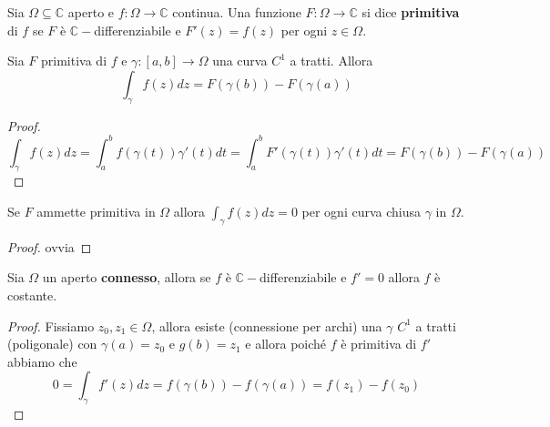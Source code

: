 \begin{definition}[Primitiva]
    Sia \(\Omega \subseteq \mathbb{C}\) aperto e \(f : \Omega \to \mathbb{C}\)
    continua. Una funzione \(F : \Omega \to \mathbb{C}\) si dice \textbf{primitiva} di
    \(f\) se \(F\) è \(\mathbb{C}-\)differenziabile e \(F'(z) = f(z)\) per ogni
    \(z \in \Omega\).
\end{definition}
\begin{proposition}
    Sia \(F\) primitiva di \(f\) e \(\gamma:[a,b] \to \Omega\) una curva
    \(C^{1}\) a tratti. Allora 
    \[
        \int_{\gamma} f(z) dz = F{(\gamma{(b)})} - F{(\gamma{(a)})}
    \]
\end{proposition}
\begin{proof}
    \[
        \int_{\gamma} f(z) dz = \int_{a}^{b} f{(\gamma{(t)})}\gamma'(t) dt =
        \int_{a}^{b} F'{(\gamma{(t)})}\gamma'(t) dt = F{(\gamma{(b)})} -
        F{(\gamma{(a)})}
    \]
\end{proof}
\begin{corollary}
    Se \(F\) ammette primitiva in \(\Omega\) allora \(\int_{\gamma} f(z) dz =
    0\) per ogni curva chiusa \(\gamma\) in \(\Omega\).
\end{corollary}
\begin{proof}
    ovvia
\end{proof}
\begin{corollary}
    Sia \(\Omega\) un aperto \textbf{connesso}, allora se \(f\) è
    \(\mathbb{C}-\)differenziabile e \(f'=0\) allora \(f\) è costante.
\end{corollary}
\begin{proof}
    Fissiamo \(z_{0}, z_{1} \in \Omega\), allora esiste (connessione per archi)
    una \(\gamma\) \(C^{1}\) a tratti (poligonale) con \(\gamma{(a)}=z_{0}\) e
    \(g{(b)}=z_{1}\) e allora poiché \(f\) è primitiva di \(f'\) abbiamo che 
    \[
        0 = \int_{\gamma} f'(z) dz = f{(\gamma{(b)})} - f{(\gamma{(a)})} =
        f(z_{1}) - f(z_{0})
    \]
\end{proof}




